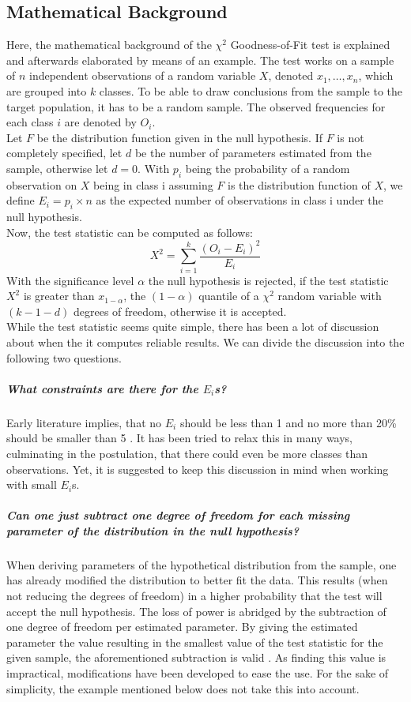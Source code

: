 \documentclass{article}
\begin{document}
\subsection{Mathematical Background}
Here, the mathematical background of the $\chi^2$ Goodness-of-Fit test is explained and afterwards elaborated by means of an example.
The test works on a sample of $n$ independent observations of a random variable $X$, denoted $x_1, \ldots, x_n$, which are grouped into $k$ classes.
To be able to draw conclusions from the sample to the target population, it has to be a random sample.
The observed frequencies for each class $i$ are denoted by $O_i$.
\\
Let $F$ be the distribution function given in the null hypothesis.
If $F$ is not completely specified, let $d$ be the number of parameters estimated from the sample, otherwise let $d=0$.
With $p_i$ being the probability of a random observation on $X$ being in class i assuming $F$ is the distribution function of $X$, we define $E_i = p_i \times n$ as the expected number of observations in class i under the null hypothesis.
\\
Now, the test statistic can be computed as follows:
\begin{equation}
	\label{eq:chisq}
	X^2 = \sum_{i=1}^{k}\frac{(O_i - E_i)^2}{E_i}
\end{equation}
With the significance level $\alpha$ the null hypothesis is rejected, if the test statistic $X^2$ is greater than $x_{1-\alpha}$, the $(1-\alpha)$ quantile of a $\chi^2$ random variable with $(k-1-d)$ degrees of freedom, otherwise it is accepted.
\\
While the test statistic seems quite simple, there has been a lot of discussion about when the it computes reliable results.
We can divide the discussion into the following two questions.
\subparagraph{What constraints are there for the $E_i$s?}
	Early literature implies, that no $E_i$ should be less than 1 and no more than 20\% should be smaller than 5 \cite{conover1980practical}.
	It has been tried to relax this in many ways, culminating in the postulation, that there could even be more classes than observations.
	Yet, it is suggested to keep this discussion in mind when working with small $E_i$s.
\subparagraph{Can one just subtract one degree of freedom for each missing parameter of the distribution in the null hypothesis?}
	When deriving parameters of the hypothetical distribution from the sample, one has already modified the distribution to better fit the data.
	This results (when not reducing the degrees of freedom) in a higher probability that the test will accept the null hypothesis.
	The loss of power is abridged by the subtraction of one degree of freedom per estimated parameter.
	By giving the estimated parameter the value resulting in the smallest value of the test statistic for the given sample, the aforementioned subtraction is valid \cite{conover1980practical}.
	As finding this value is impractical, modifications have been developed to ease the use.
	For the sake of simplicity, the example mentioned below does not take this into account.
\end{document}
